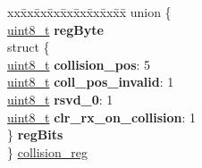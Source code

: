 \begin{DoxyCompactItemize}
\begin{tabbing}
\end{tabbing}\item 
\begin{tabbing}
xx\=xx\=xx\=xx\=xx\=xx\=xx\=xx\=xx\=\kill
union \{\\
\>\hyperlink{vl53l0x__types_8h_aba7bc1797add20fe3efdf37ced1182c5}{uint8\_t} {\bfseries regByte}\\
\>struct \{\\
\>\>\hyperlink{vl53l0x__types_8h_aba7bc1797add20fe3efdf37ced1182c5}{uint8\_t} {\bfseries collision\_pos}: 5\\
\>\>\hyperlink{vl53l0x__types_8h_aba7bc1797add20fe3efdf37ced1182c5}{uint8\_t} {\bfseries coll\_pos\_invalid}: 1\\
\>\>\hyperlink{vl53l0x__types_8h_aba7bc1797add20fe3efdf37ced1182c5}{uint8\_t} {\bfseries rsvd\_0}: 1\\
\>\>\hyperlink{vl53l0x__types_8h_aba7bc1797add20fe3efdf37ced1182c5}{uint8\_t} {\bfseries clr\_rx\_on\_collision}: 1\\
\>\} {\bfseries regBits}\\
\} \hyperlink{structstruct_ac0256f75f90f8e0587b10bd273eb127e}{collision\_reg}\\


\end{tabbing}
\end{DoxyCompactItemize}
